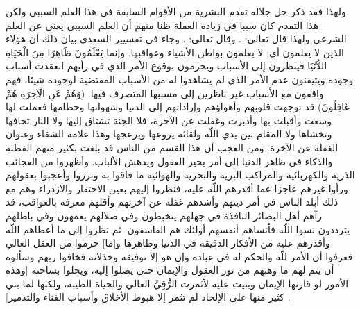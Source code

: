 ولهذا فقد ذكر جل جلاله تقدم البشرية من الأقوام السابقة في هذا العلم السببي ولكن هذا التقدم كان سببا في زيادة الغفلة ظنا منهم أن العلم السببي يغني عن العلم الشرعي ولهذا قال تعالى: 
\quranayah*[40][83]{\footnotesize \surahname*[40]}. وقال تعالى:
\quranayah*[30][7]{\footnotesize \surahname*[30]}. وجاء في تفسيير السعدي بيان ذلك أن هؤلاء الذين لا يعلمون أي: لا يعلمون بواطن الأشياء وعواقبها. وإنما {يَعْلَمُونَ ظَاهِرًا مِنَ الْحَيَاةِ الدُّنْيَا} فينظرون إلى الأسباب ويجزمون بوقوع الأمر الذي في رأيهم انعقدت أسباب وجوده ويتيقنون عدم الأمر الذي لم يشاهدوا له من الأسباب المقتضية لوجوده شيئا، فهم واقفون مع الأسباب غير ناظرين إلى مسببها المتصرف فيها. (وَهُمْ عَنِ الْآخِرَةِ هُمْ غَافِلُونَ) قد توجهت قلوبهم وأهواؤهم وإراداتهم إلى الدنيا وشهواتها وحطامها فعملت لها وسعت وأقبلت بها وأدبرت وغفلت عن الآخرة، فلا الجنة تشتاق إليها ولا النار تخافها وتخشاها ولا المقام بين يدي اللّه ولقائه يروعها ويزعجها وهذا علامة الشقاء وعنوان الغفلة عن الآخرة. ومن العجب أن هذا القسم من الناس قد بلغت بكثير منهم الفطنة والذكاء في ظاهر الدنيا إلى أمر يحير العقول ويدهش الألباب. وأظهروا من العجائب الذرية والكهربائية والمراكب البرية والبحرية والهوائية ما فاقوا به وبرزوا وأعجبوا بعقولهم ورأوا غيرهم عاجزا عما أقدرهم اللّه عليه، فنظروا إليهم بعين الاحتقار والازدراء وهم مع ذلك أبلد الناس في أمر دينهم وأشدهم غفلة عن آخرتهم وأقلهم معرفة بالعواقب، قد رآهم أهل البصائر النافذة في جهلهم يتخبطون وفي ضلالهم يعمهون وفي باطلهم يترددون نسوا اللّه فأنساهم أنفسهم أولئك هم الفاسقون. ثم نظروا إلى ما أعطاهم اللّه وأقدرهم عليه من الأفكار الدقيقة في الدنيا وظاهرها و[ما] حرموا من العقل العالي فعرفوا أن الأمر للّه والحكم له في عباده وإن هو إلا توفيقه وخذلانه فخافوا ربهم وسألوه أن يتم لهم ما وهبهم من نور العقول والإيمان حتى يصلوا إليه، ويحلوا بساحته [وهذه الأمور لو قارنها الإيمان وبنيت عليه لأثمرت الرُّقِيَّ العالي والحياة الطيبة، ولكنها لما بني كثير منها على الإلحاد لم تثمر إلا هبوط الأخلاق وأسباب الفناء والتدمير] \cite{tafsir_Saadi}.

